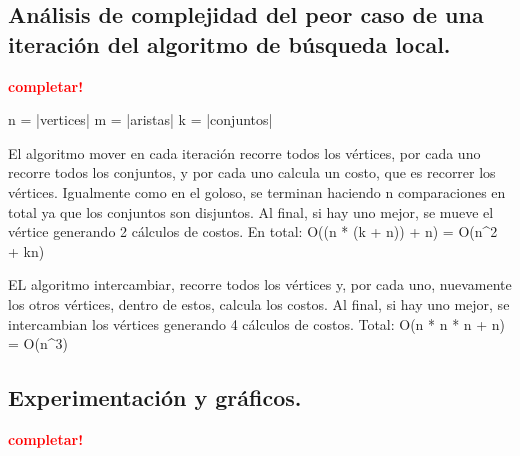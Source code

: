 \newpage
\subsection{Análisis de complejidad del peor caso de una iteración del
            algoritmo de búsqueda local.}
\vspace*{0.3cm}
\textcolor{red}{\textbf{completar!}}

n = |vertices|
m = |aristas|
k = |conjuntos|

El algoritmo mover en cada iteración recorre todos los vértices, por cada uno recorre todos los conjuntos, y por cada uno calcula un costo, que es recorrer los vértices. Igualmente como en el goloso, se terminan haciendo n comparaciones en total ya que los conjuntos son disjuntos.
Al final, si hay uno mejor, se mueve el vértice generando 2 cálculos de costos.
En total: O((n * (k + n)) + n) = O(n^2 + kn)

EL algoritmo intercambiar, recorre todos los vértices y, por cada uno, nuevamente los otros vértices, dentro de estos, calcula los costos.
Al final, si hay uno mejor, se intercambian los vértices generando 4 cálculos de costos.
Total: O(n * n * n + n) = O(n^3)

\newpage
\subsection{Experimentación y gráficos.}
\vspace*{0.3cm}
\textcolor{red}{\textbf{completar!}}
